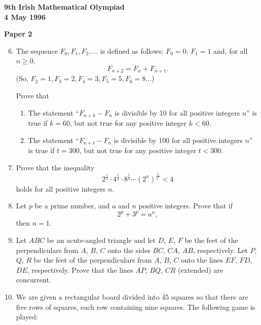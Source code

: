 \documentclass[12pt]{article}
\begin{document}
\newpage
\begin{center}
{\large\bfseries 9th Irish Mathematical Olympiad\\4 May 1996}
\end{center}
\bigskip\noindent\textbf{Paper 2}\bigskip
\begin{enumerate}
\setcounter{enumi}{5}
\item The sequence $F_0, F_1, F_2, \ldots$ is defined as follows: $F_0 = 0$, $F_1 = 1$ and, for all $n \ge 0$,
\[F_{n+2} = F_n + F_{n+1}.\]
(So, $F_2 = 1, F_3 = 2, F_4 = 3, F_5 = 5, F_6 = 8\ldots$)

Prove that
\begin{enumerate}
\item[(a)] The statement ``$F_{n+k} - F_n$ is divisible by 10 for all positive integers $n$'' is true if $k = 60$, but not true for any positive integer $k < 60$.
\item[(b)] The statement ``$F_{n+t} - F_n$ is divisible by 100 for all positive integers $n$'' is true if $t = 300$, but not true for any positive integer $t < 300$.
\end{enumerate}

\item Prove that the inequality
\[2^{\frac{1}{2}} \cdot 4^{\frac{1}{4}} \cdot 8^{\frac{1}{8}} \cdots (2^n)^{\frac{1}{2^n}} < 4\]
holds for all positive integers $n$.

\item Let $p$ be a prime number, and $a$ and $n$ positive integers. Prove that if
\[2^p + 3^p = a^n,\]
then $n = 1$.

\item Let $ABC$ be an acute-angled triangle and let $D$, $E$, $F$ be the feet of the perpendiculars from $A$, $B$, $C$ onto the sides $BC$, $CA$, $AB$, respectively. Let $P$, $Q$, $R$ be the feet of the perpendiculars from $A$, $B$, $C$ onto the lines $EF$, $FD$, $DE$, respectively. Prove that the lines $AP$, $BQ$, $CR$ (extended) are concurrent.

\item We are given a rectangular board divided into 45 squares so that there are five rows of squares, each row containing nine squares. The following game is played:


\end{enumerate}
\end{document}
